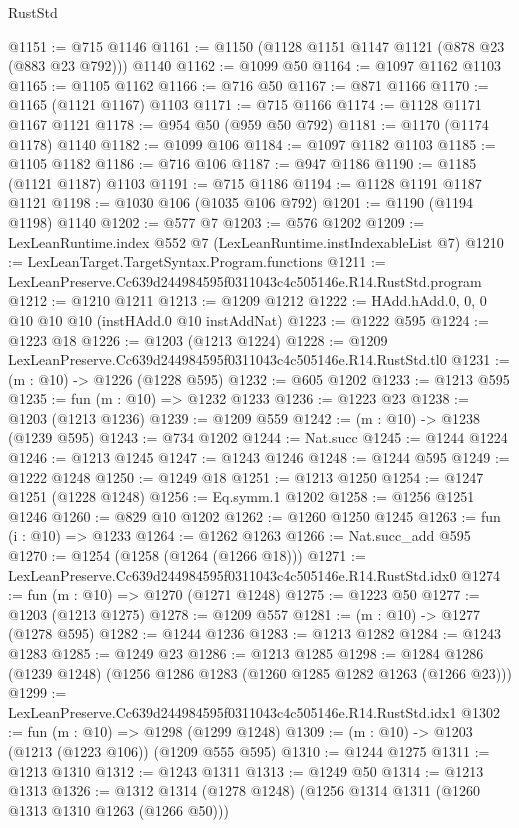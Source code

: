 \begin{lexlean}{RustStd}
\begin{coremodule}
@1151 := @715 @1146
@1161 := @1150 (@1128 @1151 @1147 @1121 (@878 @23 (@883 @23 @792))) @1140
@1162 := @1099 @50
@1164 := @1097 @1162 @1103
@1165 := @1105 @1162
@1166 := @716 @50
@1167 := @871 @1166
@1170 := @1165 (@1121 @1167) @1103
@1171 := @715 @1166
@1174 := @1128 @1171 @1167 @1121
@1178 := @954 @50 (@959 @50 @792)
@1181 := @1170 (@1174 @1178) @1140
@1182 := @1099 @106
@1184 := @1097 @1182 @1103
@1185 := @1105 @1182
@1186 := @716 @106
@1187 := @947 @1186
@1190 := @1185 (@1121 @1187) @1103
@1191 := @715 @1186
@1194 := @1128 @1191 @1187 @1121
@1198 := @1030 @106 (@1035 @106 @792)
@1201 := @1190 (@1194 @1198) @1140
@1202 := @577 @7
@1203 := @576 @1202
@1209 := LexLeanRuntime.index @552 @7 (LexLeanRuntime.instIndexableList @7)
@1210 := LexLeanTarget.TargetSyntax.Program.functions
@1211 := LexLeanPreserve.Cc639d244984595f0311043c4c505146e.R14.RustStd.program
@1212 := @1210 @1211
@1213 := @1209 @1212
@1222 := HAdd.hAdd.{0, 0, 0} @10 @10 @10 (instHAdd.{0} @10 instAddNat)
@1223 := @1222 @595
@1224 := @1223 @18
@1226 := @1203 (@1213 @1224)
@1228 := @1209 LexLeanPreserve.Cc639d244984595f0311043c4c505146e.R14.RustStd.tl0
@1231 := (m : @10) -> @1226 (@1228 @595)
@1232 := @605 @1202
@1233 := @1213 @595
@1235 := fun (m : @10) => @1232 @1233
@1236 := @1223 @23
@1238 := @1203 (@1213 @1236)
@1239 := @1209 @559
@1242 := (m : @10) -> @1238 (@1239 @595)
@1243 := @734 @1202
@1244 := Nat.succ
@1245 := @1244 @1224
@1246 := @1213 @1245
@1247 := @1243 @1246
@1248 := @1244 @595
@1249 := @1222 @1248
@1250 := @1249 @18
@1251 := @1213 @1250
@1254 := @1247 @1251 (@1228 @1248)
@1256 := Eq.symm.{1} @1202
@1258 := @1256 @1251 @1246
@1260 := @829 @10 @1202
@1262 := @1260 @1250 @1245
@1263 := fun (i : @10) => @1233
@1264 := @1262 @1263
@1266 := Nat.succ_add @595
@1270 := @1254 (@1258 (@1264 (@1266 @18)))
@1271 := LexLeanPreserve.Cc639d244984595f0311043c4c505146e.R14.RustStd.idx0
@1274 := fun (m : @10) => @1270 (@1271 @1248)
@1275 := @1223 @50
@1277 := @1203 (@1213 @1275)
@1278 := @1209 @557
@1281 := (m : @10) -> @1277 (@1278 @595)
@1282 := @1244 @1236
@1283 := @1213 @1282
@1284 := @1243 @1283
@1285 := @1249 @23
@1286 := @1213 @1285
@1298 := @1284 @1286 (@1239 @1248) (@1256 @1286 @1283 (@1260 @1285 @1282 @1263 (@1266 @23)))
@1299 := LexLeanPreserve.Cc639d244984595f0311043c4c505146e.R14.RustStd.idx1
@1302 := fun (m : @10) => @1298 (@1299 @1248)
@1309 := (m : @10) -> @1203 (@1213 (@1223 @106)) (@1209 @555 @595)
@1310 := @1244 @1275
@1311 := @1213 @1310
@1312 := @1243 @1311
@1313 := @1249 @50
@1314 := @1213 @1313
@1326 := @1312 @1314 (@1278 @1248) (@1256 @1314 @1311 (@1260 @1313 @1310 @1263 (@1266 @50)))

\end{coremodule}
\end{lexlean}
